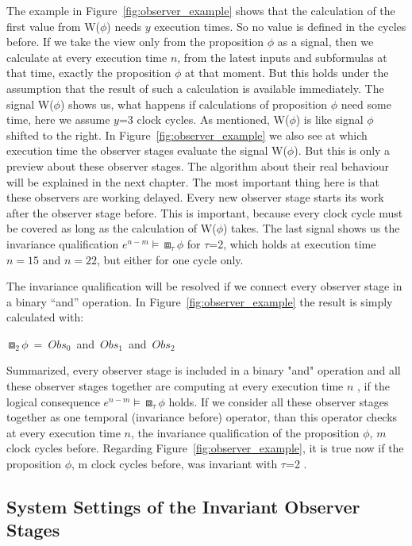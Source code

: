 The example in Figure~\ref{fig:observer_example} shows that the calculation of the first value from W($\phi$) needs $y$
execution times. So no value is defined in the cycles before. If we take the view only from the proposition $\phi$ as a signal, then we calculate
at every execution time $n$, from the latest inputs and subformulas at that time, exactly the proposition $\phi$ at that moment.
But this holds under the assumption that the result of such a calculation is available immediately.
The signal W($\phi$) shows us, what happens if calculations of proposition $\phi$ need some time, here we assume $y$=3 clock cycles.
As mentioned, W($\phi$) is like signal $\phi$ shifted to the right.
In Figure~\ref{fig:observer_example} we also see at which execution time the observer stages evaluate the signal W($\phi$).
But this is only a preview about these observer stages. The algorithm about their real behaviour will be explained in the next chapter.
The most important thing here is that these observers are working delayed. Every new observer stage starts its work after the observer stage before.
This is important, because every clock cycle must be covered as long as the calculation of W($\phi$) takes. 
The last signal shows us the invariance qualification $e^{n-m} \models \boxbox_\tau \phi$ for $\tau$=2, which holds at execution time $n=15$ and $n=22$, 
but either for one cycle only.

The invariance qualification will be resolved if we connect every observer stage in a binary ``and'' operation.
In Figure~\ref{fig:observer_example} the result is simply calculated with:
\newline
\begin{center} 
\mbox{$\boxbox_2 \phi$ = $Obs_0$ and $Obs_1$ and $Obs_2$}
\end{center}
\newpage
Summarized, every observer stage is included in a binary "and" operation and all these observer stages together are computing at every execution time $n$
, if the logical consequence $e^{n-m} \models \boxbox_\tau \phi$ holds. 
If we consider all these observer stages together as one temporal (invariance before) operator, than this operator checks
at every execution time $n$, the invariance qualification of the proposition $\phi$, $m$ clock cycles before.
Regarding Figure~\ref{fig:observer_example}, it is true now if the proposition $\phi$, m clock cycles before, was invariant with $\tau$=2 .
\newline

\subsection{System Settings of the Invariant Observer Stages}

